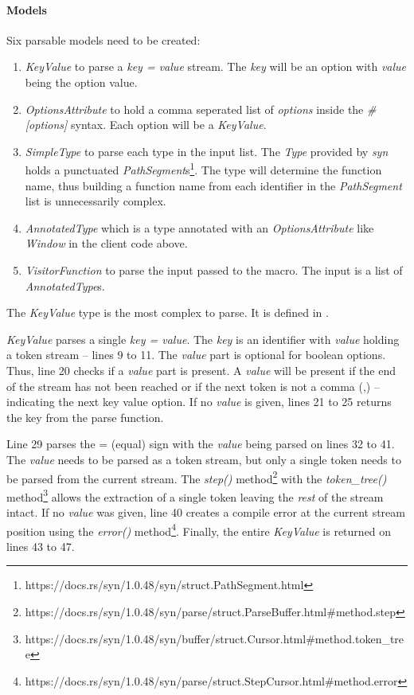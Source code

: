 \paragraph{Models}
Six parsable models need to be created:
\begin{enumerate}
	\item \textit{KeyValue} to parse a \textit{key = value} stream.
	      The \textit{key} will be an option with \textit{value} being the option value.
	\item \textit{OptionsAttribute} to hold a comma seperated list of \textit{options} inside the \textit{\#[options]} syntax.
	      Each option will be a \textit{KeyValue}.
	\item \textit{SimpleType} to parse each type in the input list.
	      The \textit{Type} provided by \textit{syn} holds a punctuated \textit{PathSegment}s\footnote{https://docs.rs/syn/1.0.48/syn/struct.PathSegment.html}.
	      The type will determine the function name, thus building a function name from each identifier in the \textit{PathSegment} list is unnecessarily complex.
	\item \textit{AnnotatedType} which is a type annotated with an \textit{OptionsAttribute} like \textit{Window} in the client code above.
	\item \textit{VisitorFunction} to parse the input passed to the macro.
	      The input is a list of \textit{AnnotatedType}s.
\end{enumerate}

The \textit{KeyValue} type is the most complex to parse.
It is defined in .


\textit{KeyValue} parses a single \textit{key = value}.
The \textit{key} is an identifier with \textit{value} holding a token stream -- lines 9 to 11.
The \textit{value} part is optional for boolean options.
Thus, line 20 checks if a \textit{value} part is present.
A \textit{value} will be present if the end of the stream has not been reached or if the next token is not a comma (,) -- indicating the next key value option.
If no \textit{value} is given, lines 21 to 25 returns the key from the parse function.

Line 29 parses the = (equal) sign with the \textit{value} being parsed on lines 32 to 41.
The \textit{value} needs to be parsed as a token stream, but only a single token needs to be parsed from the current stream.
The \textit{step()} method\footnote{https://docs.rs/syn/1.0.48/syn/parse/struct.ParseBuffer.html\#method.step} with the \textit{token\_tree()} method\footnote{https://docs.rs/syn/1.0.48/syn/buffer/struct.Cursor.html\#method.token\_tree} allows the extraction of a single token leaving the \textit{rest} of the stream intact.
If no \textit{value} was given, line 40 creates a compile error at the current stream position using the \textit{error()} method\footnote{https://docs.rs/syn/1.0.48/syn/parse/struct.StepCursor.html\#method.error}.
Finally, the entire \textit{KeyValue} is returned on lines 43 to 47.

